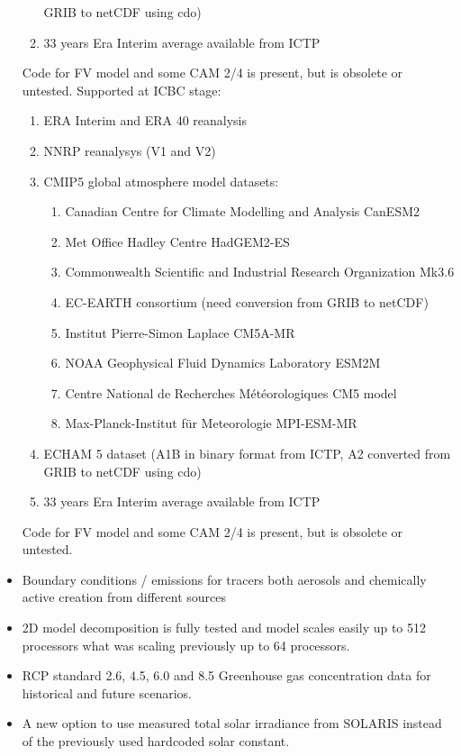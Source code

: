 \begin{itemize}
\begin{enumerate}
      GRIB
    to netCDF using cdo)
    \item 33 years Era Interim average available from ICTP
  \end{enumerate}
  Code for FV model and some CAM 2/4 is present, but is obsolete or untested.
  Supported at ICBC stage:
  \begin{enumerate}
    \item ERA Interim and ERA 40 reanalysis
    \item NNRP reanalysys (V1 and V2)
    \item CMIP5 global atmosphere model datasets:
    \begin{enumerate}
      \item Canadian Centre for Climate Modelling and Analysis CanESM2
      \item Met Office Hadley Centre HadGEM2-ES
      \item Commonwealth Scientific and Industrial Research Organization Mk3.6
      \item EC-EARTH consortium (need conversion from GRIB to netCDF)
      \item Institut Pierre-Simon Laplace CM5A-MR
      \item NOAA Geophysical Fluid Dynamics Laboratory ESM2M
      \item Centre National de Recherches Météorologiques CM5 model
      \item Max-Planck-Institut für Meteorologie MPI-ESM-MR
    \end{enumerate}
    \item ECHAM 5 dataset (A1B in binary format from ICTP, A2 converted from
      GRIB to netCDF using cdo)
    \item 33 years Era Interim average available from ICTP
  \end{enumerate}
  Code for FV model and some CAM 2/4 is present, but is obsolete or untested.
  \item Boundary conditions / emissions for tracers both aerosols and chemically
   active creation from different sources
  \item 2D model decomposition is fully tested and model scales easily up to 512
   processors what was scaling previously up to 64 processors.
  \item RCP standard 2.6, 4.5, 6.0 and 8.5 Greenhouse gas concentration data for
   historical and future scenarios.
  \item A new option to use measured total solar irradiance from SOLARIS instead
   of the previously used hardcoded solar constant.

\end{itemize}
